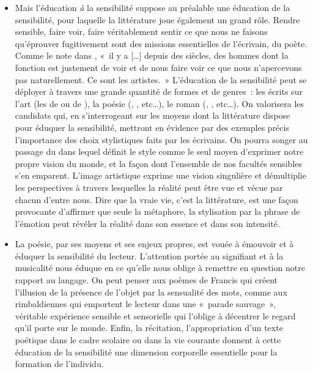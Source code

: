 {\begin{itemize}
\item Mais l'éducation \emph{à} la sensibilité suppose au préalable une éducation de la
sensibilité, pour laquelle la littérature joue également un grand rôle. Rendre
sensible, faire voir, faire véritablement sentir ce que nous ne faisons qu'éprouver
fugitivement sont des missions essentielles de l'écrivain, du poète. Comme le note
 dans , «~il y a […] depuis des siècles, des
hommes dont la fonction est justement de voir et de nous faire voir ce que nous
n'apercevons pas naturellement. Ce sont les artistes.~» L'éducation de la sensibilité
peut se déployer à travers une grande quantité de formes et de genres~: les écrits
sur l'art (les  de  ou de ), la poésie (, , etc…), le roman (, , etc…). On valorisera les candidats qui, en s'interrogeant sur les moyens
dont la littérature dispose pour éduquer la sensibilité, mettront en évidence par des
exemples précis l'importance des choix stylistiques faits par les écrivains. On
pourra songer au passage du  dans lequel  définit le style
comme le seul moyen d'exprimer notre propre vision du monde, et la façon dont
l'ensemble de nos facultés sensibles s'en emparent. L'image artistique exprime
une vision singulière et démultiplie les perspectives à travers lesquelles la réalité
peut être vue et vécue par chacun d'entre nous. Dire que la vraie vie, c'est la
littérature, est une façon provocante d'affirmer que seule la métaphore, la
stylisation par la phrase de l'émotion peut révéler la réalité dans son essence et
dans son intensité.

\item La poésie, par ses moyens et ses enjeux propres, est vouée à émouvoir et à
éduquer la sensibilité du lecteur. L'attention portée au signifiant et à la musicalité
nous éduque en ce qu'elle nous oblige à remettre en question notre rapport au
langage. On peut penser aux poèmes de Francis  qui créent l'illusion de la
présence de l'objet par la sensualité des mots, comme aux 
rimbaldiennes qui emportent le lecteur dans une «~parade sauvage~», véritable
expérience sensible et sensorielle qui l'oblige à décentrer le regard qu'il porte sur
le monde. Enfin, la récitation, l'appropriation d'un texte poétique dans le cadre
scolaire ou dans la vie courante donnent à cette éducation de la sensibilité une
dimension corporelle essentielle pour la formation de l'individu.
\end{itemize}}%

